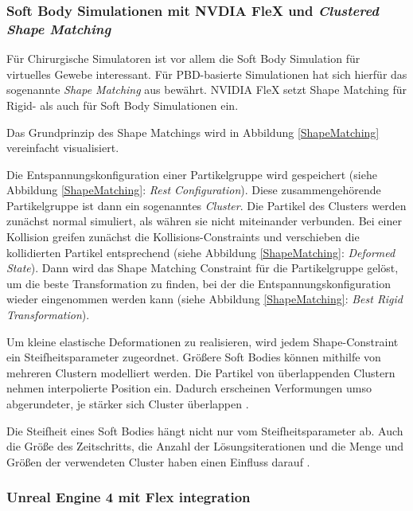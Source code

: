 \subsubsection{Soft Body Simulationen mit NVDIA FleX und \textit{Clustered Shape Matching}}

Für Chirurgische Simulatoren ist vor allem die Soft Body Simulation für virtuelles Gewebe interessant. Für PBD-basierte Simulationen hat sich hierfür das sogenannte \textit{Shape Matching} aus \cite{Shape} bewährt. NVIDIA FleX setzt Shape Matching für Rigid- als auch für Soft Body Simulationen ein.

Das Grundprinzip des Shape Matchings wird in Abbildung \ref{ShapeMatching} vereinfacht visualisiert. 


Die Entspannungskonfiguration einer Partikelgruppe wird gespeichert (siehe Abbildung \ref{ShapeMatching}: \textit{Rest Configuration}). Diese zusammengehörende Partikelgruppe ist dann ein sogenanntes \textit{Cluster}. 
Die Partikel des Clusters werden zunächst normal simuliert, als währen sie nicht miteinander verbunden.
Bei einer Kollision greifen zunächst die Kollisions-Constraints und verschieben die kollidierten Partikel entsprechend (siehe Abbildung \ref{ShapeMatching}: \textit{Deformed State}). Dann wird das Shape Matching Constraint für die Partikelgruppe gelöst, um die beste Transformation zu finden, bei der die Entspannungskonfiguration wieder eingenommen werden kann (siehe Abbildung \ref{ShapeMatching}: \textit{Best Rigid Transformation}).

Um kleine elastische Deformationen zu realisieren, wird jedem Shape-Constraint ein Steifheitsparameter zugeordnet. Größere Soft Bodies können mithilfe von mehreren Clustern modelliert werden. Die Partikel von überlappenden Clustern nehmen interpolierte Position ein. Dadurch erscheinen Verformungen umso abgerundeter, je stärker sich Cluster überlappen \cite{FlexDoc}.

Die Steifheit eines Soft Bodies hängt nicht nur vom Steifheitsparameter ab. Auch die Größe des Zeitschritts, die Anzahl der Lösungsiterationen und die Menge und Größen der verwendeten Cluster haben einen Einfluss darauf \cite{PBDKidney}.

\subsubsection{Unreal Engine 4 mit Flex integration}

